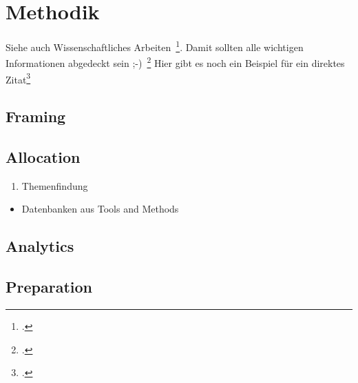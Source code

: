 \newpage
\section{Methodik} \label{infos}
Siehe auch Wissenschaftliches Arbeiten~\footcite[\vglf][S. 1]{Balzert.2008}. %
Damit sollten alle wichtigen Informationen abgedeckt sein ;-)~\footcite[\vglf][]{Balzert.2008} %
Hier gibt es noch ein Beispiel für ein direktes Zitat\footcite[][]{Balzert.2008} %

\subsection{Framing}

\subsection{Allocation}

\begin{enumerate}
\item Themenfindung
\end{enumerate}

\begin{itemize}
\item Datenbanken aus Tools and Methods
\end{itemize}

\subsection{Analytics}

\subsection{Preparation}

